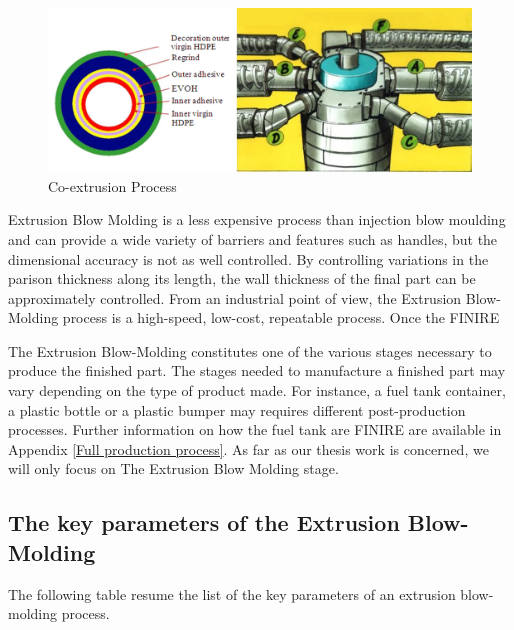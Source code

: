 \begin{figure}
\centerline{\includegraphics[scale=0.55]{images/chapter_1/coextrusion.png}}
\caption{Co-extrusion Process}
\label{fig:Co-extrusion Process}
\end{figure}

Extrusion Blow Molding is a less expensive process than injection blow moulding and can provide a wide variety of barriers and features such as handles, but the dimensional accuracy is not as well controlled. By controlling variations in the parison thickness along its length, the wall thickness of the final part can be approximately controlled. From an industrial point of view, the Extrusion Blow-Molding process is a high-speed, low-cost, repeatable process. Once the FINIRE

The Extrusion Blow-Molding constitutes one of the various stages necessary to produce the finished part. The stages needed to manufacture a finished part may vary depending on the type of product made. For instance, a fuel tank container, a plastic bottle or a plastic bumper may requires different post-production processes. Further information on how the fuel tank are FINIRE are available in Appendix \ref{Full production process}. As far as our thesis work is concerned, we will only focus on The Extrusion Blow Molding stage.


\subsection{The key parameters of the Extrusion Blow-Molding}

The following table resume the list of the key parameters of an extrusion blow-molding process.

